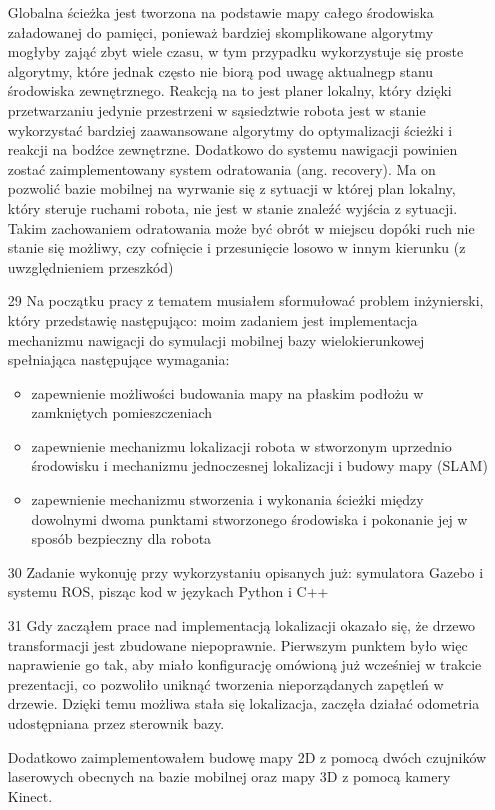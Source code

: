 \documentclass[10pt,a4paper]{article}
\begin{document}
\begin{itemize}
Globalna ścieżka jest tworzona na podstawie mapy całego środowiska załadowanej do pamięci, ponieważ bardziej skomplikowane algorytmy mogłyby zająć zbyt wiele czasu, w tym przypadku wykorzystuje się proste algorytmy, które jednak często nie biorą pod uwagę aktualnegp stanu środowiska zewnętrznego.
Reakcją na to jest planer lokalny, który dzięki przetwarzaniu jedynie przestrzeni w sąsiedztwie robota jest w stanie wykorzystać bardziej zaawansowane algorytmy do optymalizacji ścieżki i reakcji na bodźce zewnętrzne. 
Dodatkowo do systemu nawigacji powinien zostać zaimplementowany system odratowania (ang. recovery). 
Ma on pozwolić bazie mobilnej na wyrwanie się z sytuacji w której plan lokalny, który steruje ruchami robota, nie jest w stanie znaleźć wyjścia z sytuacji.
Takim zachowaniem odratowania może być obrót w miejscu dopóki ruch nie stanie się możliwy, czy cofnięcie i przesunięcie losowo w innym kierunku (z uwzględnieniem przeszkód)
		\item[29]
		Na początku pracy z tematem musiałem sformułować problem inżynierski, który przedstawię następująco:
moim zadaniem jest implementacja mechanizmu nawigacji do symulacji mobilnej bazy wielokierunkowej spełniająca następujące wymagania:
		\begin{itemize}
			\item
			zapewnienie możliwości budowania mapy na płaskim podłożu w zamkniętych pomieszczeniach
			\item
			zapewnienie mechanizmu lokalizacji robota w stworzonym uprzednio środowisku i mechanizmu jednoczesnej lokalizacji i budowy mapy (SLAM)
			\item
			zapewnienie mechanizmu stworzenia i wykonania ścieżki między dowolnymi dwoma punktami stworzonego środowiska i pokonanie jej w sposób bezpieczny dla robota
		\end{itemize}
 		\item[30]
 		Zadanie wykonuję przy wykorzystaniu opisanych już: symulatora Gazebo i systemu ROS, pisząc kod w językach Python i C++
 		\item[31]
 		Gdy zacząłem prace nad implementacją lokalizacji okazało się, że drzewo transformacji jest zbudowane niepoprawnie. 
Pierwszym punktem było więc naprawienie go tak, aby miało konfigurację omówioną już wcześniej w trakcie prezentacji, co pozwoliło uniknąć tworzenia nieporządanych zapętleń w drzewie.
Dzięki temu możliwa stała się lokalizacja, zaczęła działać odometria udostępniana przez sterownik bazy.

Dodatkowo zaimplementowałem budowę mapy 2D z pomocą dwóch czujników laserowych obecnych na bazie mobilnej oraz mapy 3D z pomocą kamery Kinect.


\end{itemize}
\end{document}
